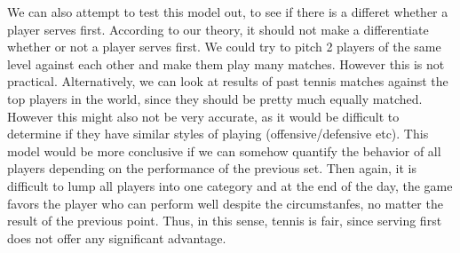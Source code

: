 \documentclass[12pt]{article}
\begin{document}
\vskip0.25in We can also attempt to test this model out, to see if there is a differet whether a player serves first. According to our theory, it should not make a differentiate whether or not a player serves first. We could try to pitch 2 players of the same level against each other and make them play many matches. However this is not practical. Alternatively, we can look at results of past tennis matches against the top players in the world, since they should be pretty much equally matched. However this might also not be very accurate, as it would be difficult to determine if they have similar styles of playing (offensive/defensive etc).
\vskip0.25in This model would be more conclusive if we can somehow quantify the behavior of all players depending on the performance of the previous set. Then again, it is difficult to lump all players into one category and at the end of the day, the game favors the player who can perform well despite the circumstanfes, no matter the result of the previous point. Thus, in this sense, tennis is fair, since serving first does not offer any significant advantage. 
\end{document}
